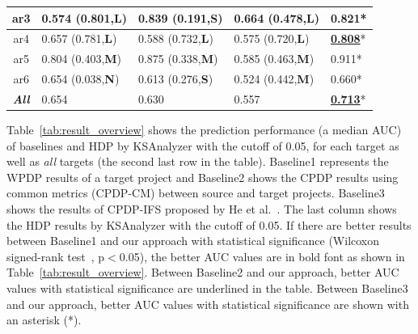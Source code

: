 \begin{table}[!t]
\begin{tabular}{|@{}c@{}||@{}C{21mm}@{}|@{}C{21mm}@{}|@{}C{21mm}@{}||@{}C{8mm}@{}|}
ar3	&0.574 (0.801,{\bf L})	&0.839 (0.191,{\bf S})	&0.664 (0.478,{\bf L})	&{\bf 0.821}* \\ \hline
ar4	&0.657 (0.781,{\bf L})	&0.588 (0.732,{\bf L})	&0.575 (0.720,{\bf L})	&\underline{{\bf 0.808}}* \\ \hline
ar5	&0.804 (0.403,{\bf M})	&0.875 (0.338,{\bf M})	&0.585 (0.463,{\bf M})	&0.911* \\ \hline
ar6	&0.654 (0.038,{\bf N})	&0.613 (0.276,{\bf S})	&0.524 (0.442,{\bf M})	&0.660* \\ \hline
\hline
{\bf {\em All}}	&0.654		&0.630		&0.557		&\underline{{\bf 0.713}}* \\ \hline



\end{tabular}
\end{table}

% 


Table~\ref{tab:result_overview} shows the prediction performance (a median AUC)
of baselines and HDP by KSAnalyzer with the cutoff of 0.05,
for each target as well as {\em all} targets (the second last row in the table). Baseline1 represents
the WPDP results of a target project and Baseline2 shows
the CPDP results using common metrics (CPDP-CM) between source and target
projects. Baseline3 shows the results of CPDP-IFS proposed by He et
al.~\cite{He14}. The last column shows the HDP results by KSAnalyzer with the
cutoff of 0.05. If there are better results between Baseline1 and our approach with statistical significance (Wilcoxon signed-rank
test~\cite{Wilcoxon45}, p$<$0.05), the better AUC values are in
bold font as shown in Table~\ref{tab:result_overview}.
Between Baseline2 and our approach, better AUC values with
statistical significance are underlined in
the table. Between Baseline3 and our approach, better AUC values with
statistical significance are shown with an asterisk (*).

